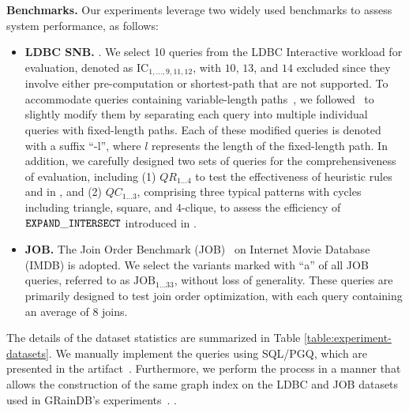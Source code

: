 \noindent\textbf{Benchmarks.} Our experiments leverage two widely used benchmarks to assess system performance, as follows:
\begin{itemize}
    \item \textbf{LDBC SNB.} .
    We select 10 queries from the LDBC Interactive workload for evaluation, denoted as $\text{IC}_{1, \ldots, 9, 11, 12}$, with $10$, $13$, and $14$ excluded since they involve either pre-computation or shortest-path that are not supported.
    To accommodate queries containing variable-length paths~\cite{graindb}, we followed~\cite{graindb} to slightly modify them by separating each query into multiple individual queries with fixed-length paths. Each of these modified queries is denoted with a suffix ``-l'', where $l$ represents the length of the fixed-length path. In addition, we carefully designed two sets of queries for the comprehensiveness of evaluation, including (1) $QR_{1\ldots 4}$ to test the effectiveness of heuristic rules \filterrule and \joinfuserule in \name, and (2) $QC_{1\ldots 3}$, comprising three typical patterns with cycles including triangle, square, and 4-clique, to assess the efficiency of $\texttt{EXPAND}\_\texttt{INTERSECT}$ introduced in .
    \item \textbf{JOB.} The Join Order Benchmark (JOB)~\cite{job_snb} on Internet Movie Database (IMDB) is adopted. We select the variants marked with ``a'' of all JOB queries, referred to as $\text{JOB}_{1\ldots 33}$, without loss of generality. These queries are primarily designed to test join order optimization, with each query containing an average of $8$ joins.
\end{itemize}
The details of the dataset statistics are summarized in Table \ref{table:experiment-datasets}.
We manually implement the queries using SQL/PGQ, which are presented in the artifact~\cite{artifact}.
Furthermore, we perform the \rgmapping process in a manner that allows the construction of the same graph index on the LDBC and JOB datasets used in GRainDB's experiments~\cite{graindb}.
.


